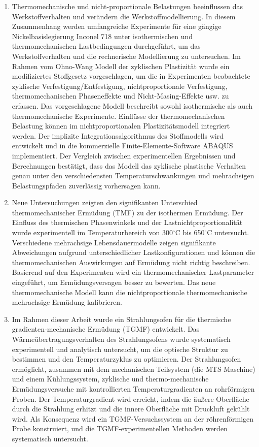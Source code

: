 \begin{enumerate}
\item Thermomechanische und nicht-proportionale Belastungen beeinflussen das Werkstoffverhalten und verändern die Werkstoffmodellierung. In diesem Zusammenhang werden umfangreiche Experimente für eine gängige Nickelbasislegierung Inconel 718 unter isothermischen und thermomechanischen Lastbedingungen durchgeführt, um das Werkstoffverhalten und die rechnerische Modellierung zu untersuchen. Im Rahmen vom Ohno-Wang Modell der zyklischen Plastizität wurde ein modifiziertes Stoffgesetz vorgeschlagen, um die in Experimenten beobachtete zyklische Verfestigung/Entfestigung, nichtproportionale Verfestigung, thermomechanischen Phaseneffekte und Nicht-Masing-Effekte usw. zu erfassen. Das vorgeschlagene Modell beschreibt sowohl isothermische als auch thermomechanische Experimente. Einflüsse der thermomechanischen Belastung können im nichtproportionalen Plastizitätsmodell integriert werden. Der implizite Integrationsalgorithmus des Stoffmodells wird entwickelt und in die kommerzielle Finite-Elemente-Software ABAQUS implementiert. Der Vergleich zwischen experimentellen Ergebnissen und Berechnungen bestätigt, dass das Modell das zyklische plastische Verhalten genau unter den verschiedensten Temperaturschwankungen und mehrachsigen Belastungspfaden zuverlässig vorhersagen kann.

\item Neue Untersuchungen zeigten den signifikanten Unterschied thermomechanischer Ermüdung (TMF) zu der isothermen Ermüdung. Der Einfluss des thermischen Phasenwinkels und der Lastnichtproportionalität wurde experimentell im Temperaturbereich von 300$^{\circ}$C bis 650$^{\circ}$C untersucht. Verschiedene mehrachsige Lebensdauermodelle zeigen signifikante Abweichungen aufgrund unterschiedlicher Lastkonfigurationen und können die thermomechanischen Auswirkungen auf Ermüdung nicht richtig beschreiben. Basierend auf den Experimenten wird ein thermomechanischer Lastparameter eingeführt, um Ermüdungsversagen besser zu bewerten. Das neue thermomechanische Modell kann die nichtproportionale thermomechanische mehrachsige Ermüdung kalibrieren.

\item Im Rahmen dieser Arbeit wurde ein Strahlungsofen für die thermische gradienten-mechanische Ermüdung (TGMF) entwickelt. Das Wärmeübertragungsverhalten des Strahlungsofens wurde systematisch experimentell und analytisch untersucht, um die optische Struktur zu bestimmen und den Temperaturzyklus zu optimieren. Der Strahlungsofen ermöglicht, zusammen mit dem mechanischen Teilsystem (die MTS Maschine) und einem Kühlungssystem, zyklische und thermo-mechanische Ermüdungsversuche mit kontrollierten Temperaturgradienten an rohrförmigen Proben. Der Temperaturgradient wird erreicht, indem die äußere Oberfläche durch die Strahlung erhitzt und die innere Oberfläche mit Druckluft gekühlt wird. Als Konsequenz wird ein TGMF-Versuchssystem an der röhrenförmigen Probe konstruiert, und die TGMF-experimentellen Methoden werden systematisch untersucht.


\end{enumerate}
